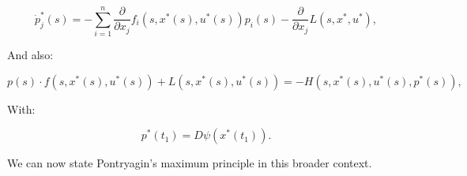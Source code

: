 \begin{equation}\label{4-3-pontrydotp}
    \dot{p}_j^{\ast}(s) =  - \sum_{i=1}^n \frac{\partial}{\partial x_{j}}f_i(s,x^{\ast}(s),u^{\ast}(s))p_i(s) - \frac{\partial}{\partial x_{j}} L(s,x^{\ast},u^{\ast})  ,
\end{equation}

And also:

\begin{equation}\label{4-3-pontry-maxH}
    p(s)\cdot f(s,x^{\ast}(s),u^{\ast}(s)) + L(s,x^{\ast}(s),u^{\ast}(s)) = -H(s,x^{\ast}(s),u^{\ast}(s),p^{\ast}(s)),
\end{equation}

With:

\begin{equation}\label{4-3-pontryp}
    p^{\ast}(t_1) = D \psi(x^{\ast}(t_1)).
\end{equation}

We can now state Pontryagin's maximum principle in this broader context.

